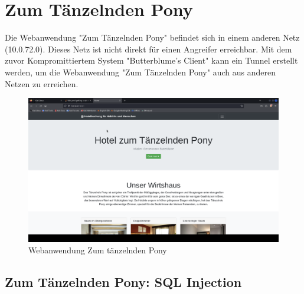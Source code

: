 \chapter{Zum Tänzelnden Pony}
Die Webanwendung "Zum Tänzelnden Pony" befindet sich in einem anderen Netz (10.0.72.0). Dieses Netz ist nicht direkt für einen Angreifer erreichbar. Mit dem zuvor Kompromittiertem System "Butterblume's Client" kann ein Tunnel erstellt werden, um die Webanwendung "Zum Tänzelnden Pony" auch aus anderen Netzen zu erreichen.
\begin{figure}[!ht]
    \centering
    \includegraphics[width=\linewidth]{images/screenshots/11_taenzelndes_pony.png}
    \caption{Webanwendung Zum tänzelnden Pony}
    \label{fig:09_taenzelndes_pony}
\end{figure}
\newpage


\section{\makecvssbadge Zum Tänzelnden Pony: SQL Injection}

